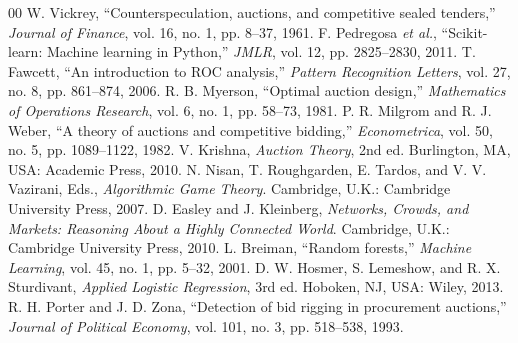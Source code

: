 \documentclass[conference]{IEEEtran}
\begin{document}
\begin{thebibliography}{00}
 W. Vickrey, ``Counterspeculation, auctions, and competitive sealed tenders,'' \emph{Journal of Finance}, vol. 16, no. 1, pp. 8--37, 1961.
 F. Pedregosa \emph{et al.}, ``Scikit-learn: Machine learning in Python,'' \emph{JMLR}, vol. 12, pp. 2825--2830, 2011.
 T. Fawcett, ``An introduction to ROC analysis,'' \emph{Pattern Recognition Letters}, vol. 27, no. 8, pp. 861--874, 2006.
 R. B. Myerson, ``Optimal auction design,'' \emph{Mathematics of Operations Research}, vol. 6, no. 1, pp. 58--73, 1981.
 P. R. Milgrom and R. J. Weber, ``A theory of auctions and competitive bidding,'' \emph{Econometrica}, vol. 50, no. 5, pp. 1089--1122, 1982.
 V. Krishna, \emph{Auction Theory}, 2nd ed. Burlington, MA, USA: Academic Press, 2010.
 N. Nisan, T. Roughgarden, E. Tardos, and V. V. Vazirani, Eds., \emph{Algorithmic Game Theory}. Cambridge, U.K.: Cambridge University Press, 2007.
 D. Easley and J. Kleinberg, \emph{Networks, Crowds, and Markets: Reasoning About a Highly Connected World}. Cambridge, U.K.: Cambridge University Press, 2010.
 L. Breiman, ``Random forests,'' \emph{Machine Learning}, vol. 45, no. 1, pp. 5--32, 2001.
 D. W. Hosmer, S. Lemeshow, and R. X. Sturdivant, \emph{Applied Logistic Regression}, 3rd ed. Hoboken, NJ, USA: Wiley, 2013.
 R. H. Porter and J. D. Zona, ``Detection of bid rigging in procurement auctions,'' \emph{Journal of Political Economy}, vol. 101, no. 3, pp. 518--538, 1993.
\end{thebibliography}
\end{document}
